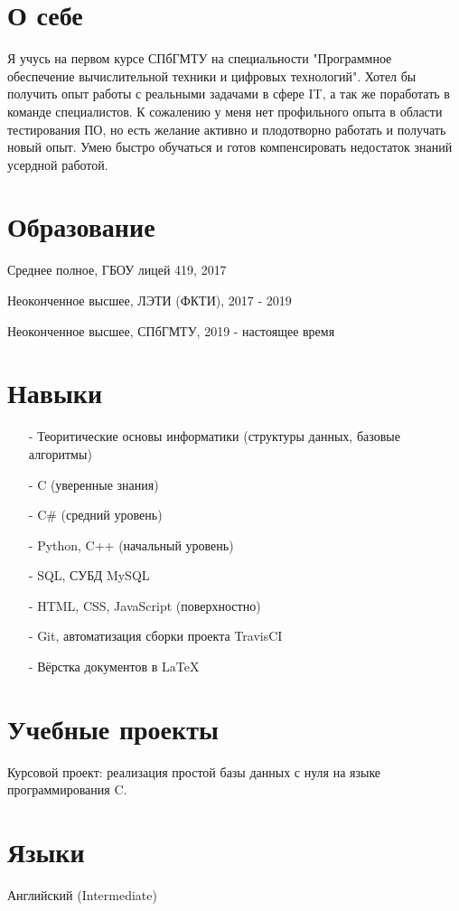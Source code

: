 \documentclass[11pt,a4paper]{moderncv}
\begin{document}
\maketitle

\section{О себе} %
Я учусь на первом курсе СПбГМТУ на специальности "Программное обеспечение вычислительной техники и цифровых технологий".
Хотел бы получить опыт работы с реальными задачами в сфере IT,
а так же поработать в команде специалистов.
К сожалению у меня нет профильного опыта в области тестирования ПО,
но есть желание активно и плодотворно работать и получать новый опыт.
Умею быстро обучаться и готов компенсировать недостаток знаний усердной работой.
\section{Образование}
Среднее полное, ГБОУ лицей 419, 2017

Неоконченное высшее, ЛЭТИ (ФКТИ), 2017 - 2019

Неоконченное высшее, СПбГМТУ, 2019 - настоящее время


\section{Навыки}
\begin{enumerate}
    \item[-] Теоритические основы информатики (структуры данных, базовые алгоритмы)
    \item[-] C (уверенные знания)
    \item[-] C\# (средний уровень)
    \item[-] Python, C++ (начальный уровень)
    \item[-] SQL, СУБД MySQL
    \item[-] HTML, CSS, JavaScript (поверхностно)
    \item[-] Git, автоматизация сборки проекта TravisCI
    \item[-] Вёрстка документов в LaTeX
\end{enumerate}

\section{Учебные проекты}
Курсовой проект: реализация простой базы данных с нуля на языке программирования C.
\section{Языки}
Английский (Intermediate)
 
\end{document}
